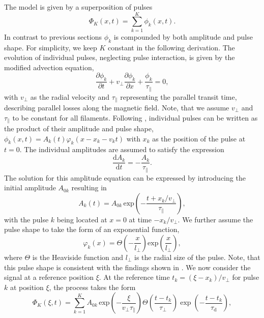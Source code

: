The model is given by a superposition of pulses 
\begin{equation}
	\Phi_K(x,t) = \sum_{k=1}^{K} \phi_k(x,t).
\end{equation}
In contrast to previous sections $\phi_k$ is compounded by both amplitude and pulse shape. For simplicity, we keep $K$ constant in the following derivation. The evolution of individual pulses, neglecting pulse interaction, is given by the modified advection equation,
\begin{equation}\label{phi_equation}
	\frac{\partial \phi_k}{\partial t} + v_\perp\frac{\partial \phi_k}{\partial x} + \frac{\phi_k}{\tau_\parallel} = 0,
\end{equation}
with $v_\perp$ as the radial velocity and $\tau_\parallel$ representing the parallel transit time, describing parallel losses along the magnetic field. Note, that we assume $v_\perp$ and $\tau_\parallel$ to be constant for all filaments. Following , individual pulses can be written as the product of their amplitude and pulse shape, $	\phi_k(x,t) = A_k(t)\varphi_k(x-x_k-v_k t)$ with $x_k$ as the position of the pulse at $t=0$. The individual amplitudes are assumed to satisfy the expression 
\begin{equation}
	\frac{\mathrm{d}A_k}{\mathrm{d}t} = -\frac{A_k}{\tau_\parallel}.
\end{equation}
The solution for this amplitude equation can be expressed by introducing the initial amplitude $A_{0k}$ resulting in
\begin{equation}
	A_k(t) = A_{0k}\,\mathrm{exp}\left(-\frac{t+x_k/v_\perp}{\tau_\parallel}\right),
\end{equation}
with the pulse $k$ being located at $x=0$ at time $-x_k/v_\perp$. We further assume the pulse shape to take the form of an exponential function,
\begin{equation}
	\varphi_k(x) = \Theta\left(-\frac{x}{l_\perp}\right)\mathrm{exp}\left(\frac{x}{l_\perp}\right),
\end{equation}
where $\Theta$ is the Heaviside function and $l_\perp$ is the radial size of the pulse. Note, that this pulse shape is consistent with the findings shown in . We now consider the signal at a reference position $\xi$. At the reference time $t_k = (\xi - x_k)/v_\perp$ for pulse $k$ at position $\xi$, the process takes the form
\begin{equation}
	\Phi_K(\xi, t) = \sum_{k=1}^{K}A_{0k}\,\mathrm{exp}\left(-\frac{\xi}{v_\perp \tau_\parallel}\right)\Theta\left(\frac{t-t_k}{\tau_\perp}\right)\exp\left(-\frac{t-t_k}{\tau_\mathrm{d}}\right),
\end{equation}
